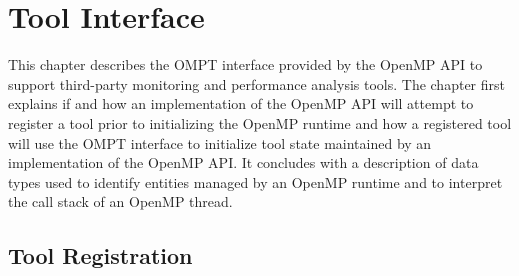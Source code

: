 %
%
%
%
%
%
%
%
%
%


\chapter{Tool Interface}
\label{chap:ToolsSupport}

This chapter describes the OMPT interface provided by the OpenMP API 
to support third-party monitoring and performance analysis tools.
The chapter first explains if and how an implementation of
the OpenMP API will attempt to register a tool prior to initializing the OpenMP runtime and
how a registered tool will use the OMPT interface to initialize tool state maintained by 
an implementation of the OpenMP API. 
It concludes with a description of data types 
used to identify entities managed by an OpenMP runtime and to interpret the
call stack of an OpenMP thread.

\section{Tool Registration}
\label{sec:ToolsSupport_Registration}

